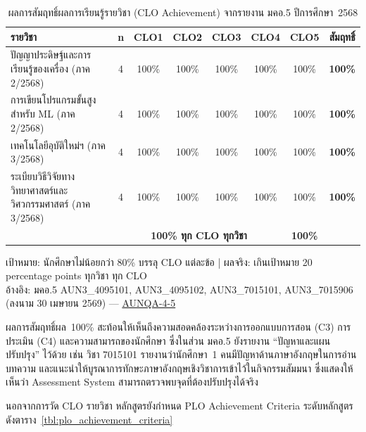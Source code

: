 \begin{table}[H]
  \centering
  \caption{ผลการสัมฤทธิ์ผลการเรียนรู้รายวิชา (CLO Achievement) จากรายงาน มคอ.5 ปีการศึกษา~2568}
  \label{tbl:clo_achievement_mko5}
  \begingroup
  \footnotesize
  \setlength{\tabcolsep}{3pt}
  \renewcommand{\arraystretch}{1.2}
  \begin{tabularx}{\linewidth}{|>{\raggedright\arraybackslash}X|c|c|c|c|c|c|c|}
    \hline
    \textbf{รายวิชา} & \textbf{n} & \textbf{CLO1} & \textbf{CLO2} & \textbf{CLO3} & \textbf{CLO4} & \textbf{CLO5} & \textbf{สัมฤทธิ์} \\
    \hline
    4095101 ปัญญาประดิษฐ์และการเรียนรู้ของเครื่อง (ภาค 2/2568) & 4 & 100\% & 100\% & 100\% & 100\% & 100\% & \textbf{100\%} \\
    \hline
    4095102 การเขียนโปรแกรมขั้นสูงสำหรับ ML (ภาค 2/2568) & 4 & 100\% & 100\% & 100\% & 100\% & 100\% & \textbf{100\%} \\
    \hline
    7015101 เทคโนโลยีอุบัติใหม่ฯ (ภาค 3/2568) & 4 & 100\% & 100\% & 100\% & 100\% & 100\% & \textbf{100\%} \\
    \hline
    7015906 ระเบียบวิธีวิจัยทางวิทยาศาสตร์และวิศวกรรมศาสตร์ (ภาค 3/2568) & 4 & 100\% & 100\% & 100\% & 100\% & 100\% & \textbf{100\%} \\
    \hline
    \multicolumn{2}{|l|}{\textbf{ภาพรวม (ทุกวิชา ทุก CLO)}} & \multicolumn{5}{c|}{\textbf{100\% ทุก CLO ทุกวิชา}} & \textbf{100\%} \\
    \hline
  \end{tabularx}
  \endgroup
  \begin{flushleft}
    \footnotesize เป้าหมาย: นักศึกษาไม่น้อยกว่า 80\% บรรลุ CLO แต่ละข้อ | ผลจริง: เกินเป้าหมาย 20 percentage points ทุกวิชา ทุก CLO \\
    อ้างอิง: มคอ.5 AUN3\_4095101, AUN3\_4095102, AUN3\_7015101, AUN3\_7015906 (ลงนาม 30 เมษายน 2569) — \hyperlink{ref:AUNQA-4-5}{AUNQA-4-5}
  \end{flushleft}
\end{table}

ผลการสัมฤทธิ์ผล~100\% สะท้อนให้เห็นถึงความสอดคล้องระหว่างการออกแบบการสอน (C3) การประเมิน (C4) และความสามารถของนักศึกษา ซึ่งในส่วน มคอ.5 ยังรายงาน ``ปัญหาและแผนปรับปรุง'' ไว้ด้วย เช่น วิชา 7015101 รายงานว่านักศึกษา~1 คนมีปัญหาด้านภาษาอังกฤษในการอ่านบทความ และแนะนำให้บูรณาการทักษะภาษาอังกฤษเชิงวิชาการเข้าไว้ในกิจกรรมสัมมนา ซึ่งแสดงให้เห็นว่า Assessment System สามารถตรวจพบจุดที่ต้องปรับปรุงได้จริง

นอกจากการวัด CLO รายวิชา หลักสูตรยังกำหนด PLO Achievement Criteria ระดับหลักสูตรดังตาราง~\ref{tbl:plo_achievement_criteria}

